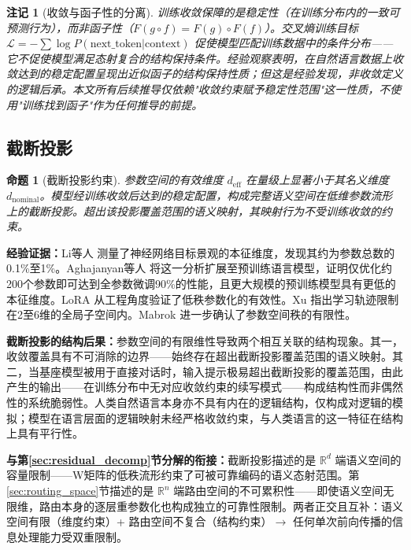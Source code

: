 \documentclass[11pt,a4paper]{article}
\newtheorem{proposition}[theorem]{命题}
\newtheorem{remark}[theorem]{注记}
\theoremstyle{definition}
\begin{document}
\begin{remark}[收敛与函子性的分离]
训练收敛保障的是稳定性（在训练分布内的一致可预测行为），而非函子性（$F(g \circ f) = F(g) \circ F(f)$）。交叉熵训练目标 $\mathcal{L} = -\sum \log P(\text{next\_token}|\text{context})$ 促使模型匹配训练数据中的条件分布——它不促使模型满足态射复合的结构保持条件。经验观察表明，在自然语言数据上收敛达到的稳定配置呈现出近似函子的结构保持性质；但这是经验发现，非收敛定义的逻辑后承。本文所有后续推导仅依赖"收敛约束赋予稳定性范围"这一性质，不使用"训练找到函子"作为任何推导的前提。
\end{remark}

\subsection{截断投影}
\label{sec:truncated_projection}

\begin{proposition}[截断投影约束]
参数空间的有效维度 $d_{\text{eff}}$ 在量级上显著小于其名义维度 $d_{\text{nominal}}$。模型经训练收敛后达到的稳定配置，构成完整语义空间在低维参数流形上的截断投影。超出该投影覆盖范围的语义映射，其映射行为不受训练收敛的约束。
\end{proposition}

\textbf{经验证据：}Li等人 \cite{li2018intrinsic} 测量了神经网络目标景观的本征维度，发现其约为参数总数的0.1\%至1\%。Aghajanyan等人 \cite{aghajanyan2020intrinsic} 将这一分析扩展至预训练语言模型，证明仅优化约200个参数即可达到全参数微调90\%的性能，且更大规模的预训练模型具有更低的本征维度。LoRA \cite{hu2021lora} 从工程角度验证了低秩参数化的有效性。Xu \cite{xu2026parameter} 指出学习轨迹限制在2至6维的全局子空间内。Mabrok \cite{mabrok2026rank} 进一步确认了参数空间秩的有限性。

\textbf{截断投影的结构后果：}参数空间的有限维性导致两个相互关联的结构现象。其一，收敛覆盖具有不可消除的边界——始终存在超出截断投影覆盖范围的语义映射。其二，当基座模型被用于直接对话时，输入提示极易超出截断投影的覆盖范围，由此产生的输出——在训练分布中无对应收敛约束的续写模式——构成结构性而非偶然性的系统脆弱性。人类自然语言本身亦不具有内在的逻辑结构，仅构成对逻辑的模拟；模型在语言层面的逻辑映射未经严格收敛约束，与人类语言的这一特征在结构上具有平行性。

\textbf{与第\ref{sec:residual_decomp}节分解的衔接：}截断投影描述的是 $\mathbb{R}^d$ 端语义空间的容量限制——W矩阵的低秩流形约束了可被可靠编码的语义态射范围。第\ref{sec:routing_space}节描述的是 $\mathbb{R}^n$ 端路由空间的不可累积性——即使语义空间无限维，路由本身的逐层重参数化也构成独立的可靠性限制。两者正交且互补：语义空间有限（维度约束）+ 路由空间不复合（结构约束）$\to$ 任何单次前向传播的信息处理能力受双重限制。
\end{document}
